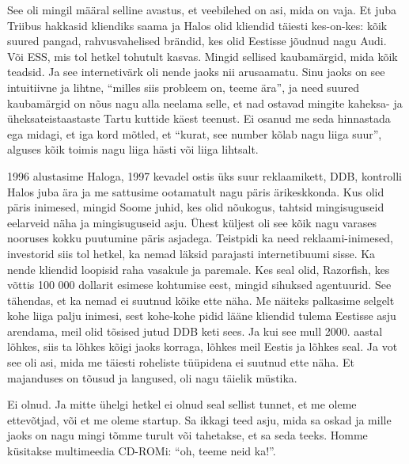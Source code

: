 See oli mingil määral selline avastus, et veebilehed on asi, mida on vaja. 
Et juba Triibus hakkasid kliendiks saama ja Halos olid   
kliendid täiesti kes-on-kes: kõik suured pangad,  rahvusvahelised 
brändid, kes olid Eestisse jõudnud nagu Audi. Või ESS, mis tol hetkel tohutult 
kasvas. Mingid sellised kaubamärgid, mida kõik teadsid. Ja see internetivärk 
oli nende jaoks nii arusaamatu. Sinu jaoks on see intuitiivne ja lihtne, 
\enquote{milles siis probleem on, teeme ära}, ja need suured kaubamärgid on  
nõus nagu alla neelama selle, et nad ostavad mingite kaheksa- ja 
üheksateistaastaste Tartu kuttide käest teenust. Ei osanud me seda hinnastada 
ega midagi, et iga kord mõtled, et \enquote{kurat, see number kõlab nagu liiga 
suur},  alguses kõik toimis nagu liiga hästi või liiga lihtsalt. 

1996 alustasime Haloga, 1997 kevadel ostis üks suur reklaamikett, 
DDB, kontrolli Halos juba ära ja  me sattusime ootamatult nagu päris 
ärikeskkonda. Kus olid päris inimesed, mingid Soome juhid, kes olid nõukogus, 
tahtsid mingisuguseid eelarveid näha ja mingisuguseid asju. Ühest küljest oli 
see kõik nagu varases nooruses  kokku puutumine päris asjadega.  Teistpidi ka 
need reklaami-inimesed,  investorid siis tol hetkel, ka nemad läksid 
parajasti internetibuumi sisse. Ka nende kliendid loopisid raha vasakule ja 
paremale.  Kes seal olid, Razorfish, kes võttis  100 000 dollarit esimese 
kohtumise eest, mingid sihuksed agentuurid. See tähendas, et ka nemad ei 
suutnud kõike ette näha. Me näiteks palkasime selgelt kohe liiga palju inimesi, 
sest kohe-kohe pidid  lääne kliendid tulema Eestisse asju arendama, meil olid 
tõsised jutud DDB keti sees. Ja kui see mull  2000. aastal 
lõhkes, siis ta lõhkes 
kõigi jaoks korraga, lõhkes meil Eestis ja lõhkes seal. Ja vot see oli asi, 
mida me  täiesti roheliste tüüpidena ei suutnud ette näha. Et majanduses  on 
tõusud ja langused, oli nagu täielik müstika. 


Ei olnud. Ja mitte ühelgi hetkel ei olnud seal sellist tunnet, et me oleme 
ettevõtjad, või et me oleme startup. Sa ikkagi teed asju, mida sa oskad ja 
mille jaoks on nagu mingi tõmme turult või tahetakse, et sa seda teeks. Homme 
küsitakse multimeedia CD-ROMi: \enquote{oh, teeme neid ka!}. 


